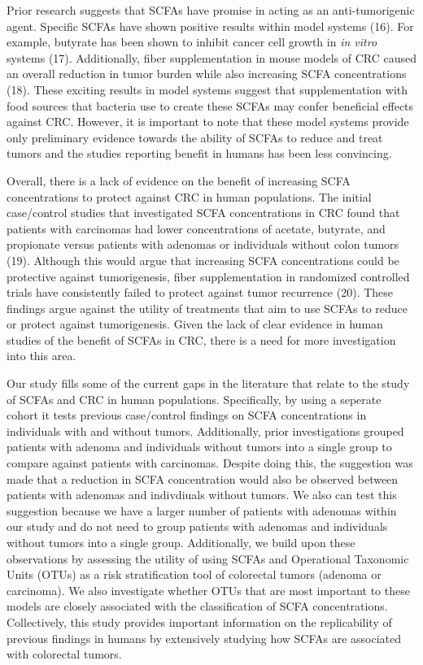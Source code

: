 \documentclass[11pt,]{article}
\begin{document}
Prior research suggests that SCFAs have promise in acting as an
anti-tumorigenic agent. Specific SCFAs have shown positive results
within model systems (16). For example, butyrate has been shown to
inhibit cancer cell growth in \emph{in vitro} systems (17).
Additionally, fiber supplementation in mouse models of CRC caused an
overall reduction in tumor burden while also increasing SCFA
concentrations (18). These exciting results in model systems suggest
that supplementation with food sources that bacteria use to create these
SCFAs may confer beneficial effects against CRC. However, it is
important to note that these model systems provide only preliminary
evidence towards the ability of SCFAs to reduce and treat tumors and the
studies reporting benefit in humans has been less convincing.

Overall, there is a lack of evidence on the benefit of increasing SCFA
concentrations to protect against CRC in human populations. The initial
case/control studies that investigated SCFA concentrations in CRC found
that patients with carcinomas had lower concentrations of acetate,
butyrate, and propionate versus patients with adenomas or individuals
without colon tumors (19). Although this would argue that increasing
SCFA concentrations could be protective against tumorigenesis, fiber
supplementation in randomized controlled trials have consistently failed
to protect against tumor recurrence (20). These findings argue against
the utility of treatments that aim to use SCFAs to reduce or protect
against tumorigenesis. Given the lack of clear evidence in human studies
of the benefit of SCFAs in CRC, there is a need for more investigation
into this area.

Our study fills some of the current gaps in the literature that relate
to the study of SCFAs and CRC in human populations. Specifically, by
using a seperate cohort it tests previous case/control findings on SCFA
concentrations in individuals with and without tumors. Additionally,
prior investigations grouped patients with adenoma and individuals
without tumors into a single group to compare against patients with
carcinomas. Despite doing this, the suggestion was made that a reduction
in SCFA concentration would also be observed between patients with
adenomas and indivdiuals without tumors. We also can test this
suggestion because we have a larger number of patients with adenomas
within our study and do not need to group patients with adenomas and
individuals without tumors into a single group. Additionally, we build
upon these observations by assessing the utility of using SCFAs and
Operational Taxonomic Units (OTUs) as a risk stratification tool of
colorectal tumors (adenoma or carcinoma). We also investigate whether
OTUs that are most important to these models are closely associated with
the classification of SCFA concentrations. Collectively, this study
provides important information on the replicability of previous findings
in humans by extensively studying how SCFAs are associated with
colorectal tumors.
\end{document}
